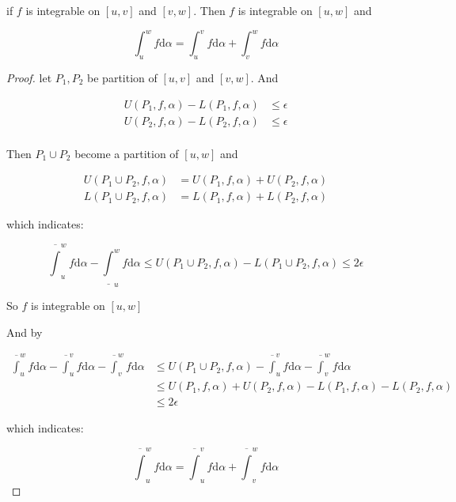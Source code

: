 \begin{thm}
    \label{thm:int-of-near-interval}
    if  $f$ is integrable on $[u,v]$ and $[v,w]$.
    Then $f$ is integrable on $[u,w]$ and

    \[
        \int_{u}^w f \mathrm{d} \alpha = \int_{u}^v f \mathrm{d} \alpha + \int_{v}^w f \mathrm{d}\alpha
    \]
\end{thm}

\begin{proof}
    let $P_1, P_2$ be partition of $[u,v]$ and $[v,w]$. And 

    \begin{align*}
        U(P_1,f,\alpha) - L(P_1,f,\alpha) &\le \epsilon \\
        U(P_2,f,\alpha) - L(P_2,f,\alpha) &\le \epsilon \\
    \end{align*}

    Then $P_1 \cup P_2$ become a partition of $[u,w]$ and

    \begin{align*}
        U(P_1 \cup P_2,f,\alpha) &=U(P_1,f,\alpha) + U(P_2,f,\alpha) \\
        L(P_1 \cup P_2,f,\alpha) &= L(P_1,f,\alpha) + L(P_2,f,\alpha)
    \end{align*}

    which indicates:

    \[
        \overline{\int}_u^w f \mathrm{d} \alpha -\underline{\int}_u^w f \mathrm{d} \alpha \le U(P_1 \cup P_2,f,\alpha) - L(P_1 \cup P_2,f,\alpha) \le 2\epsilon
    \]

    So $f$ is integrable on $[u,w]$

    And by

    \begin{align*}
        \overline{\int}_u^w f \mathrm{d} \alpha - \overline{\int}_u^v f \mathrm{d}\alpha - \overline{\int}_v^w f \mathrm{d} \alpha &\le U(P_1 \cup P_2,f,\alpha)  - \overline{\int}_u^v f \mathrm{d}\alpha - \overline{\int}_v^w f \mathrm{d} \alpha \\
         & \le U(P_1, f, \alpha) + U(P_2,f,\alpha) - L(P_1, f, \alpha) - L(P_2,f,\alpha) \\
         & \le 2\epsilon
    \end{align*}

    which indicates:

    \[
        \overline{\int}_u^w f \mathrm{d} \alpha  = \overline{\int}_u^v f \mathrm{d} \alpha + \overline{\int}_v^w f \mathrm{d} \alpha
    \]
\end{proof}

